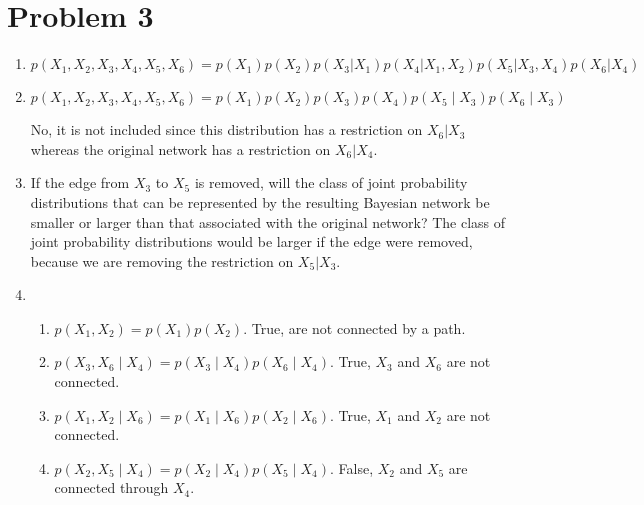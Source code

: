\documentclass[english]{article}
\begin{document}
\section*{Problem 3}
\begin{enumerate}
    \item $p\left(X_{1}, X_{2}, X_{3}, X_{4}, X_{5}, X_{6}\right)= p(X_1)p(X_2)p(X_3 | X_1)p(X_4 | X_1, X_2)p(X_5 | X_3, X_4)p(X_6 | X_4)$
    
    \item $p\left(X_{1}, X_{2}, X_{3}, X_{4}, X_{5}, X_{6}\right)=p\left(X_{1}\right) p\left(X_{2}\right) p\left(X_{3}\right) p\left(X_{4}\right) p\left(X_{5} \mid X_{3}\right) p\left(X_{6} \mid X_{3}\right)$
    
    No, it is not included since this distribution has a restriction on $X_6 | X_3$ whereas the original network has a restriction on $X_6 | X_4$.
    \item If the edge from $X_3$ to $X_5$ is removed, will the class of joint probability distributions that can be represented by the resulting Bayesian network be smaller or larger than that associated with the original network?
    \newline
    The class of joint probability distributions would be larger if the edge were removed, because we are removing the restriction on $X_5 | X_3$.
    \item 
    \begin{enumerate}
        \item $p\left(X_{1}, X_{2}\right)=p\left(X_{1}\right) p\left(X_{2}\right)$. True, are not connected by a path.
        \item $p\left(X_{3}, X_{6} \mid X_{4}\right)=p\left(X_{3} \mid X_{4}\right) p\left(X_{6} \mid X_{4}\right)$. True, $X_3$ and $X_6$ are not connected.
        \item $p\left(X_{1}, X_{2} \mid X_{6}\right)=p\left(X_{1} \mid X_{6}\right) p\left(X_{2} \mid X_{6}\right)$. True, $X_1$ and $X_2$ are not connected.
        \item $p\left(X_{2}, X_{5} \mid X_{4}\right)=p\left(X_{2} \mid X_{4}\right) p\left(X_{5} \mid X_{4}\right)$. False, $X_2$ and $X_5$ are connected through $X_4$.
    \end{enumerate}
\end{enumerate}
\end{document}
